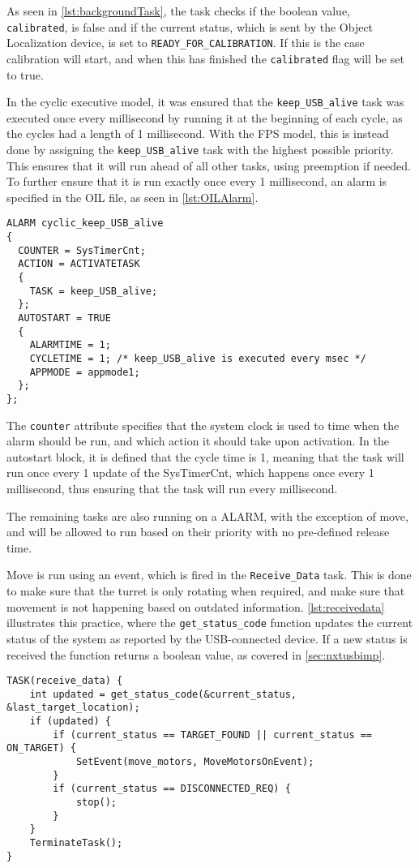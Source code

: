 As seen in \autoref{lst:backgroundTask}, the task checks if the boolean value, \texttt{calibrated}, is false and if the current status, which is sent by the Object Localization device, is set to \texttt{READY\_FOR\_CALIBRATION}.
If this is the case calibration will start, and when this has finished the \texttt{calibrated} flag will be set to true.

In the cyclic executive model, it was ensured that the \texttt{keep\_USB\_alive} task was executed once every millisecond by running it at the beginning of each cycle, as the cycles had a length of 1 millisecond.
With the FPS model, this is instead done by assigning the \texttt{keep\_USB\_alive} task with the highest possible priority.
This ensures that it will run ahead of all other tasks, using preemption if needed.
To further ensure that it is run exactly once every 1 millisecond, an alarm is specified in the OIL file, as seen in \autoref{lst:OILAlarm}.

\begin{lstlisting}[language=CSharp,label={lst:OILAlarm},caption={Alarm in the OIL}]
ALARM cyclic_keep_USB_alive
{
  COUNTER = SysTimerCnt;
  ACTION = ACTIVATETASK
  {
    TASK = keep_USB_alive;
  };
  AUTOSTART = TRUE
  {
    ALARMTIME = 1;
    CYCLETIME = 1; /* keep_USB_alive is executed every msec */
    APPMODE = appmode1;
  };
};
\end{lstlisting}

The \texttt{counter} attribute specifies that the system clock is used to time when the alarm should be run, and which action it should take upon activation.
In the autostart block, it is defined that the cycle time is 1, meaning that the task will run once every 1 update of the SysTimerCnt, which happens once every 1 millisecond, thus ensuring that the task will run every millisecond.

The remaining tasks are also running on a ALARM, with the exception of move, and will be allowed to run based on their priority with no pre-defined release time.

Move is run using an event, which is fired in the \texttt{Receive\_Data} task.
This is done to make sure that the turret is only rotating when required, and make sure that movement is not happening based on outdated information.
\autoref{lst:receivedata} illustrates this practice, where the \texttt{get\_status\_code} function updates the current status of the system as reported by the USB-connected device.
If a new status is received the function returns a boolean value, as covered in \autoref{sec:nxtusbimp}.

\begin{lstlisting}[language=CSharp,label={lst:receivedata},caption={The function handling fetching data}]
TASK(receive_data) {
	int updated = get_status_code(&current_status, &last_target_location);
	if (updated) {
		if (current_status == TARGET_FOUND || current_status == ON_TARGET) {
			SetEvent(move_motors, MoveMotorsOnEvent);
		}
		if (current_status == DISCONNECTED_REQ) {
			stop();
		}
	}
	TerminateTask();
}
\end{lstlisting}

